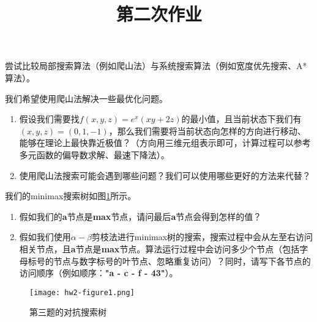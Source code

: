 \endofdump
{}

    \title{第二次作业}
    \maketitle
    
    \begin{problem}
        尝试比较局部搜索算法（例如爬山法）与系统搜索算法（例如宽度优先搜索、A*算法）。
    \end{problem}

    \begin{problem}
        我们希望使用爬山法解决一些最优化问题。
        \begin{enumerate}
            \item 假设我们需要找$f(x,y,z) = e^x(xy+2z)$的最小值，且当前状态下我们有$(x,y,z) = (0,1,-1)$，那么我们需要将当前状态向怎样的方向进行移动、能够在理论上最快靠近极值？（方向用三维元组表示即可，计算过程可以参考多元函数的偏导数求解、最速下降法）。
            \item 使用爬山法搜索可能会遇到哪些问题？我们可以使用哪些更好的方法来代替？
        \end{enumerate}
    \end{problem}

    \begin{problem}
        我们的minimax搜索树如图\ref{hw2-figure1}所示。
        \begin{enumerate}
            \item 假如我们的\textbf{a}节点是\textbf{max}节点，请问最后\textbf{a}节点会得到怎样的值？
            \item 假如我们使用$\alpha-\beta$剪枝法进行minimax树的搜索，搜索过程中会从左至右访问相关节点，且\textbf{a}节点是\textbf{max}节点。算法运行过程中会访问多少个节点（包括字母标号的节点与数字标号的叶节点、忽略重复访问）？同时，请写下各节点的访问顺序（例如顺序：\textbf{"a - c - f - 43"}）。
        \end{enumerate}
\begin{figure}[H]
  \centering
  \texttt{[image: hw2-figure1.png]}
  \caption{第三题的对抗搜索树}
  \label{hw2-figure1}
\end{figure}
    \end{problem}


